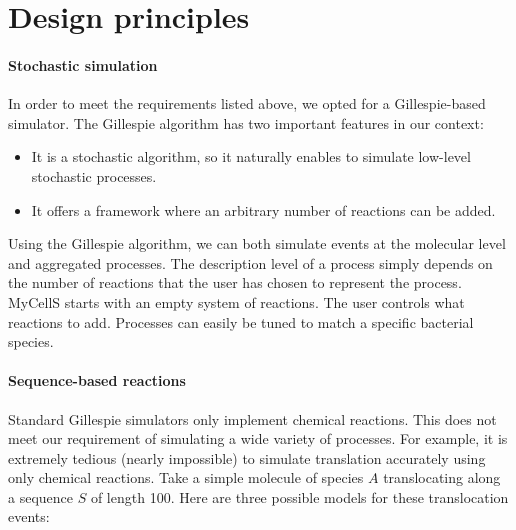 \section{Design principles}

\paragraph{Stochastic simulation}
In order to meet the requirements listed above,
we opted for a Gillespie-based simulator.
The Gillespie algorithm has two important features in our context:
\begin{itemize}
  \item It is a stochastic algorithm, so it naturally enables to simulate
  low-level stochastic processes.
  \item It offers a framework where an arbitrary number of reactions can
  be added.
\end{itemize}
Using the Gillespie algorithm, we can both simulate events at the molecular
level and aggregated processes.
The description level of a process simply depends on the number of reactions
that the user has chosen to represent the process.
MyCellS starts with an empty system of reactions.
The user controls what reactions to add.
Processes can easily be tuned to match a specific bacterial species.

\paragraph{Sequence-based reactions}
Standard Gillespie simulators only implement chemical reactions.
This does not meet our requirement of simulating a wide variety of processes.
For example, it is extremely tedious (nearly impossible) to simulate
translation accurately using only chemical reactions.
Take a simple molecule of species $A$ translocating along a sequence $S$
of length 100.
Here are three possible models for these translocation events:

